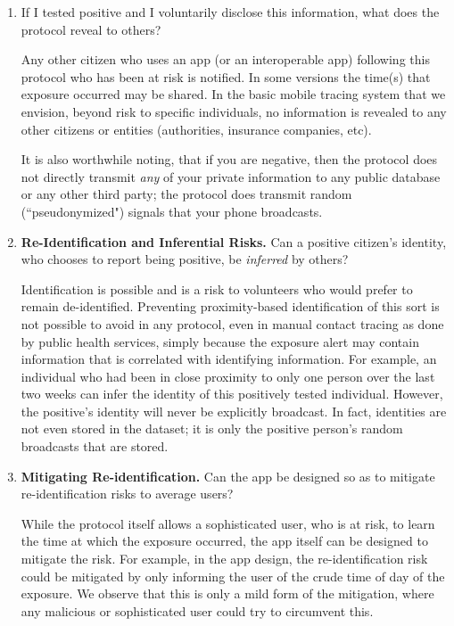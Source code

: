 \documentclass{article}
\begin{document}
\begin{enumerate}[leftmargin=*]
\item If I tested positive and I voluntarily disclose this information, what does the protocol reveal to others?

Any other citizen who uses an app (or an interoperable app) following this protocol who has been at risk is notified. In some versions the time(s) that exposure occurred may be shared.  In the basic mobile tracing system that we envision, beyond risk to specific individuals, no information is revealed to any other citizens or entities (authorities, insurance companies, etc). 

 
It is also worthwhile noting, that if you are negative, then the protocol does not directly transmit \emph{any} of your private information to any public database or any other third party; the protocol does transmit random (``pseudonymized") signals that your phone broadcasts. %

\item \textbf{Re-Identification and Inferential Risks.} Can a positive citizen's identity, who chooses to report being positive, be \emph{inferred} by others? 

Identification is possible and is a risk to volunteers who would prefer to remain de-identified.  Preventing proximity-based identification of this sort is not possible to avoid in any protocol, even in manual contact tracing as done by public health services, simply because the exposure alert may contain information that is correlated with identifying information.
For example, an individual who had been in close proximity to only one person over the last two weeks can infer the identity of this positively tested individual. 
However, the positive's identity will never be explicitly broadcast. In fact, identities are not even stored in the dataset; it is only the positive person's random broadcasts that are stored.

\item \textbf{Mitigating Re-identification.} Can the app be designed so as to mitigate re-identification risks to average users?

While the protocol itself allows a sophisticated user, who is at risk, to learn the time at which the exposure occurred, the app itself can be designed to mitigate the risk. For example, in the app design, the re-identification risk could be mitigated by only informing the user of the crude time of day of the exposure. We observe that this is only a mild form of the mitigation, where any malicious or sophisticated user could try to circumvent this.


\end{enumerate}
\end{document}
